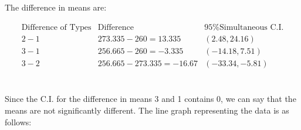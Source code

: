 \documentclass{article}
\begin{document}
\begin{flushleft}
    The difference in means are:
\end{flushleft}
\begin{equation*}
    \begin{array}{c|c|c}
        \text{Difference of Types} &\text{Difference}&95\% \text{Simultaneous C.I.}\\
        \hline
        2 - 1 & 273.335 - 260 = 13.335 & (2.48, 24.16)\\
        3 - 1 & 256.665 - 260 = -3.335 & (-14.18, 7.51)\\
        3 - 2 & 256.665 - 273.335 = -16.67 & (-33.34, -5.81)\\
    
    \end{array}
    \end{equation*}\\
\begin{flushleft}
    Since the C.I. for the difference in means 3 and 1 contains 0, we can say that the means are not significantly different. The line graph representing the data is as follows:
\end{flushleft}

\end{document}
